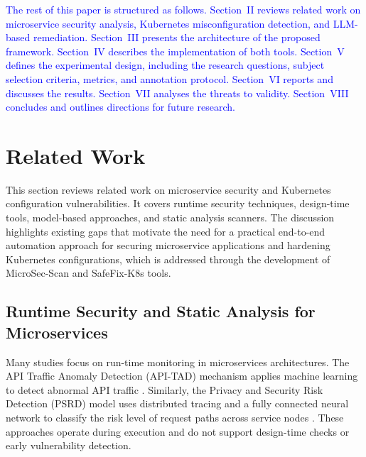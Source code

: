 \documentclass[preprint,12pt]{elsarticle}
\newcommand{\new}[1]{\textcolor{blue}{#1}}
\begin{document}
\new{The rest of this paper is structured as follows. Section~II reviews related work on microservice security analysis, Kubernetes misconfiguration detection, and LLM-based remediation. Section~III presents the architecture of the proposed framework. Section~IV describes the implementation of both tools. Section~V defines the experimental design, including the research questions, subject selection criteria, metrics, and annotation protocol. Section~VI reports and discusses the results. Section~VII analyses the threats to validity. Section~VIII concludes and outlines directions for future research.}


















\section{Related Work}
\label{sec:lit_gap}

This section reviews related work on microservice security and Kubernetes configuration vulnerabilities. It covers runtime security techniques, design-time tools, model-based approaches, and static analysis scanners. The discussion highlights existing gaps that motivate the need for a practical end-to-end automation approach for securing microservice applications and hardening Kubernetes configurations, which is addressed through the development of MicroSec-Scan and SafeFix-K8s tools.



\subsection{Runtime Security and Static Analysis for Microservices}



Many studies focus on run-time monitoring in microservices architectures. The API Traffic Anomaly Detection (API-TAD) mechanism applies machine learning to detect abnormal API traffic \cite{sowmya2023apitad}. Similarly, the Privacy and Security Risk Detection (PSRD) model uses distributed tracing and a fully connected neural network to classify the risk level of request paths across service nodes \cite{chou2021}. These approaches operate during execution and do not support design-time checks or early vulnerability detection.
\end{document}
